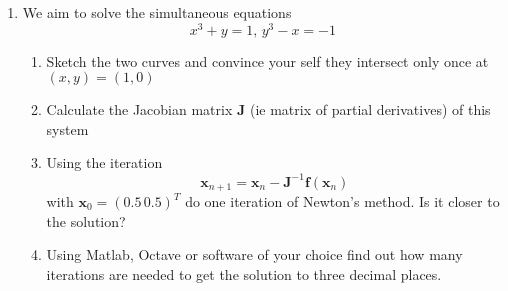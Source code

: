 \documentclass[11pt,a4paper]{article}
\begin{document}
\begin{enumerate}
{}{}%

\item We aim to solve the simultaneous equations 
\begin{equation*}
x^3 +y =1, \, y^3 -x =-1
\end{equation*}
\begin{enumerate}
	\item Sketch the two curves and convince your self they intersect only once at $(x,y)=(1,0)$
	\item Calculate the Jacobian matrix $\mathbf{J}$ (ie matrix  of partial derivatives) of this system
	\item Using the iteration 
	$$ \mathbf{x}_{n+1}=\mathbf{x}_{n} - \mathbf{J}^{-1}\mathbf{f}(\mathbf{x}_n) $$ with $\mathbf{x}_{0}=(0.5\,  0.5)^T$  do one iteration of Newton's method. Is it closer to the solution?
	\item Using Matlab, Octave or software of your choice find out how many iterations are needed to get the solution to three decimal places.
\end{enumerate}
\end{enumerate}
\end{document}
